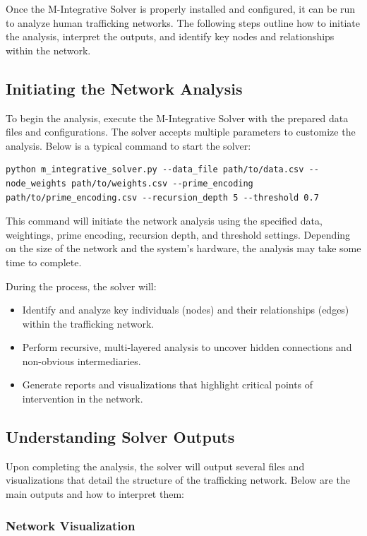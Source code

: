 \documentclass[%
 preprint, linenumbers,
 amsmath,amssymb,
 aps, physrev,
]{revtex4-2}
\begin{document}
Once the M-Integrative Solver is properly installed and configured, it can be run to analyze human trafficking networks. The following steps outline how to initiate the analysis, interpret the outputs, and identify key nodes and relationships within the network.

\subsection{Initiating the Network Analysis}

To begin the analysis, execute the M-Integrative Solver with the prepared data files and configurations. The solver accepts multiple parameters to customize the analysis. Below is a typical command to start the solver:

\begin{verbatim}
python m_integrative_solver.py --data_file path/to/data.csv --node_weights path/to/weights.csv --prime_encoding path/to/prime_encoding.csv --recursion_depth 5 --threshold 0.7
\end{verbatim}

This command will initiate the network analysis using the specified data, weightings, prime encoding, recursion depth, and threshold settings. Depending on the size of the network and the system's hardware, the analysis may take some time to complete.

During the process, the solver will:
\begin{itemize}
    \item Identify and analyze key individuals (nodes) and their relationships (edges) within the trafficking network.
    \item Perform recursive, multi-layered analysis to uncover hidden connections and non-obvious intermediaries.
    \item Generate reports and visualizations that highlight critical points of intervention in the network.
\end{itemize}

\subsection{Understanding Solver Outputs}

Upon completing the analysis, the solver will output several files and visualizations that detail the structure of the trafficking network. Below are the main outputs and how to interpret them:

\subsubsection{Network Visualization}
\end{document}
